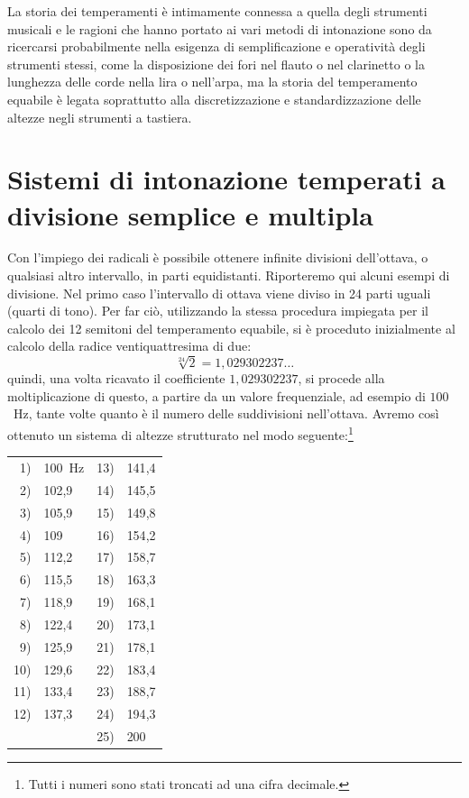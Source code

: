 La storia dei temperamenti è intimamente connessa a quella degli strumenti
musicali e le ragioni che hanno portato ai vari metodi di intonazione sono da
ricercarsi probabilmente nella esigenza di semplificazione e operatività degli
strumenti stessi, come la disposizione dei fori nel flauto o nel clarinetto o
la lunghezza delle corde nella lira o nell'arpa, ma la storia del temperamento
equabile è legata soprattutto alla discretizzazione e standardizzazione delle
altezze negli strumenti a tastiera.

\section{Sistemi di intonazione temperati a divisione semplice e multipla}

Con l'impiego dei radicali è possibile ottenere infinite divisioni dell'ottava,
o qualsiasi altro intervallo, in parti equidistanti. Riporteremo qui alcuni
esempi di divisione. Nel primo caso l'intervallo di ottava viene diviso in 24
parti uguali (quarti di tono). Per far ciò, utilizzando la stessa procedura
impiegata per il calcolo dei 12 semitoni del temperamento equabile, si è
proceduto inizialmente al calcolo della radice ventiquattresima di due:
\[
  \sqrt[24]{2} = 1{,}029302237\ldots
\]
quindi, una volta ricavato il coefficiente $1{,}029302237$, si procede alla
moltiplicazione di questo, a partire da un valore frequenziale, ad esempio di
$100$~Hz, tante volte quanto è il numero delle suddivisioni nell'ottava.
Avremo così ottenuto un sistema di altezze strutturato nel modo
seguente:\footnote{Tutti i numeri sono stati troncati ad una cifra decimale.}

\begin{center}\small
\begin{tabular}{r l@{\qquad\qquad}r l}
 1) & 100~Hz & 13) & 141{,}4 \\
 2) & 102{,}9 & 14) & 145{,}5 \\
 3) & 105{,}9 & 15) & 149{,}8 \\
 4) & 109     & 16) & 154{,}2 \\
 5) & 112{,}2 & 17) & 158{,}7 \\
 6) & 115{,}5 & 18) & 163{,}3 \\
 7) & 118{,}9 & 19) & 168{,}1 \\
 8) & 122{,}4 & 20) & 173{,}1 \\
 9) & 125{,}9 & 21) & 178{,}1 \\
10) & 129{,}6 & 22) & 183{,}4 \\
11) & 133{,}4 & 23) & 188{,}7 \\
12) & 137{,}3 & 24) & 194{,}3 \\
    &         & 25) & 200     \\
\end{tabular}
\end{center}

